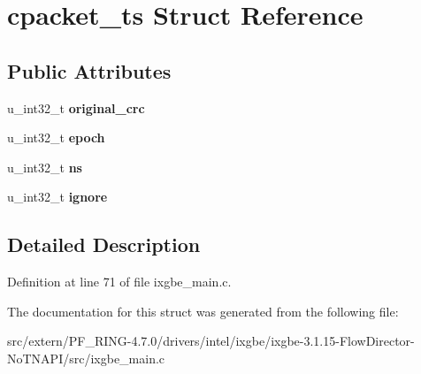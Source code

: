 \hypertarget{structcpacket__ts}{
\section{cpacket\_\-ts Struct Reference}
\label{structcpacket__ts}
}
\subsection*{Public Attributes}
\begin{DoxyCompactItemize}
\item 
\hypertarget{structcpacket__ts_a0ea988c06ff6500d9ef374e1d0e13c57}{
u\_\-int32\_\-t {\bfseries original\_\-crc}}
\label{structcpacket__ts_a0ea988c06ff6500d9ef374e1d0e13c57}

\item 
\hypertarget{structcpacket__ts_aece71b22e2985f88e29dce8a30b03bb1}{
u\_\-int32\_\-t {\bfseries epoch}}
\label{structcpacket__ts_aece71b22e2985f88e29dce8a30b03bb1}

\item 
\hypertarget{structcpacket__ts_ae7b849e544e6a1c97b97112f19fe2b32}{
u\_\-int32\_\-t {\bfseries ns}}
\label{structcpacket__ts_ae7b849e544e6a1c97b97112f19fe2b32}

\item 
\hypertarget{structcpacket__ts_a400f7789f815ac7515bb932573184968}{
u\_\-int32\_\-t {\bfseries ignore}}
\label{structcpacket__ts_a400f7789f815ac7515bb932573184968}

\end{DoxyCompactItemize}


\subsection{Detailed Description}


Definition at line 71 of file ixgbe\_\-main.c.



The documentation for this struct was generated from the following file:\begin{DoxyCompactItemize}
\item 
src/extern/PF\_\-RING-\/4.7.0/drivers/intel/ixgbe/ixgbe-\/3.1.15-\/FlowDirector-\/NoTNAPI/src/ixgbe\_\-main.c\end{DoxyCompactItemize}
